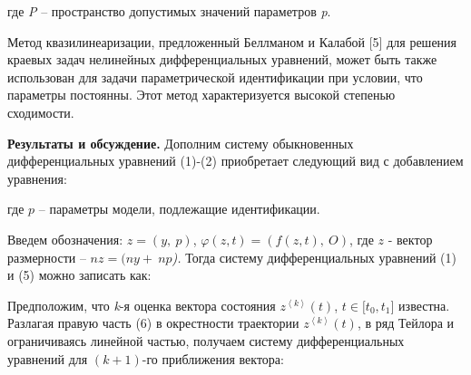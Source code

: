 где \emph{P} -- пространство допустимых значений параметров \emph{p}.

Метод квазилинеаризации, предложенный Беллманом и Калабой {[}5{]} для
решения краевых задач нелинейных дифференциальных уравнений, может быть
также использован для задачи параметрической идентификации при условии,
что параметры постоянны. Этот метод характеризуется высокой степенью
сходимости.

{\bfseries Результаты и обсуждение.} Дополним систему обыкновенных
дифференциальных уравнений (1)-(2) приобретает следующий вид с
добавлением уравнения:


где \(p\) -- параметры модели, подлежащие идентификации.

Введем обозначения: \(z = (y,\ p)\),
\(\varphi(z,t) = \left( f(z,t),\ O \right)\), где \(z\) - вектор
размерности -- \(nz = (ny + \ np\)\emph{).} Тогда систему
дифференциальных уравнений (1) и (5) можно записать как:


Предположим, что \emph{k}-я оценка вектора состояния
\(z^{\left\langle k \right\rangle}(t)\),
\(t \in \lbrack t_{0},t_{1}\rbrack\) известна. Разлагая правую часть (6)
в окрестности траектории \(z^{\left\langle k \right\rangle}(t)\), в ряд
Тейлора и ограничиваясь линейной частью, получаем систему
дифференциальных уравнений для \((k + 1)\)-го приближения вектора:

